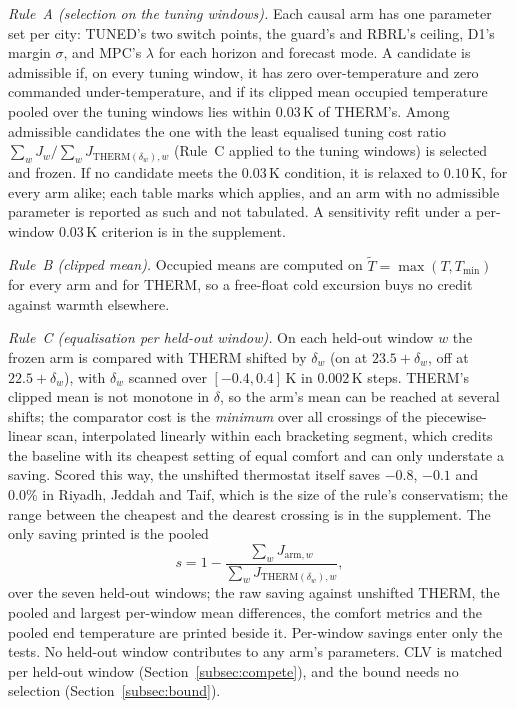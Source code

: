 \documentclass[pdflatex,sn-mathphys-num,iicol]{sn-jnl}
\theoremstyle{thmstyleone}\newtheorem{proposition}{Proposition}\newtheorem{corollary}{Corollary}
\theoremstyle{thmstyletwo}\newtheorem{remark}{Remark}\newtheorem{observation}{Observation}
\theoremstyle{thmstylethree}\newtheorem{definition}{Definition}
\newcommand{\Tmin}{T_{\min}}
\begin{document}
\emph{Rule~A (selection on the tuning windows).} Each causal arm has one parameter set per city: TUNED's two switch points, the guard's and RBRL's ceiling, D1's margin $\sigma$, and MPC's $\lambda$ for each horizon and forecast mode. A candidate is admissible if, on every tuning window, it has zero over-temperature and zero commanded under-temperature, and if its clipped mean occupied temperature pooled over the tuning windows lies within $0.03\,$K of THERM's. Among admissible candidates the one with the least equalised tuning cost ratio $\sum_wJ_w/\sum_wJ_{\mathrm{THERM}(\delta_w),w}$ (Rule~C applied to the tuning windows) is selected and frozen. If no candidate meets the $0.03\,$K condition, it is relaxed to $0.10\,$K, for every arm alike; each table marks which applies, and an arm with no admissible parameter is reported as such and not tabulated. A sensitivity refit under a per-window $0.03\,$K criterion is in the supplement.

\emph{Rule~B (clipped mean).} Occupied means are computed on $\tilde T=\max(T,\Tmin)$ for every arm and for THERM, so a free-float cold excursion buys no credit against warmth elsewhere.

\emph{Rule~C (equalisation per held-out window).} On each held-out window $w$ the frozen arm is compared with THERM shifted by $\delta_w$ (on at $23.5+\delta_w$, off at $22.5+\delta_w$), with $\delta_w$ scanned over $[-0.4,0.4]\,$K in $0.002\,$K steps. THERM's clipped mean is not monotone in $\delta$, so the arm's mean can be reached at several shifts; the comparator cost is the \emph{minimum} over all crossings of the piecewise-linear scan, interpolated linearly within each bracketing segment, which credits the baseline with its cheapest setting of equal comfort and can only understate a saving. Scored this way, the unshifted thermostat itself saves $-0.8$, $-0.1$ and $0.0\%$ in Riyadh, Jeddah and Taif, which is the size of the rule's conservatism; the range between the cheapest and the dearest crossing is in the supplement. The only saving printed is the pooled
\begin{equation}
  s=1-\frac{\sum_{w}J_{\mathrm{arm},w}}{\sum_{w}J_{\mathrm{THERM}(\delta_w),w}},
  \label{eq:saving}
\end{equation}
over the seven held-out windows; the raw saving against unshifted THERM, the pooled and largest per-window mean differences, the comfort metrics and the pooled end temperature are printed beside it. Per-window savings enter only the tests. No held-out window contributes to any arm's parameters. CLV is matched per held-out window (Section~\ref{subsec:compete}), and the bound needs no selection (Section~\ref{subsec:bound}).
\end{document}
